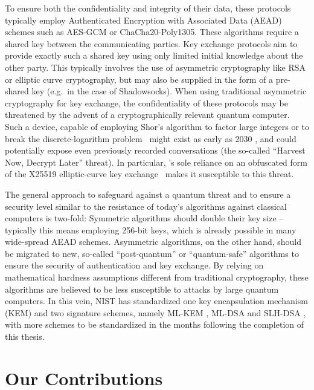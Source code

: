 To ensure both the confidentiality and integrity of their data, these protocols typically employ Authenticated Encryption with Associated Data (AEAD) schemes such as AES-GCM or ChaCha20-Poly1305. These algorithms require a shared key between the communicating parties. Key exchange protocols aim to provide exactly such a shared key using only limited initial knowledge about the other party. This typically involves the use of asymmetric cryptography like RSA or elliptic curve cryptography, but may also be supplied in the form of a pre-shared key (e.g.~in the case of Shadowsocks).
When using traditional asymmetric cryptography for key exchange, the confidentiality of these protocols may be threatened by the advent of a cryptographically relevant quantum computer.
Such a device, capable of employing Shor's algorithm \cite{Shor_1997} to factor large integers or to break the discrete-logarithm problem~\cite{crqc-nccoe} might exist as early as 2030 \cite{quantum-threat-nist,quantum-threat-enisa,quantum-threat-bsi,quantum-threat-joint,quantum-threat-anssi}, and could potentially expose even previously recorded conversations (the so-called ``Harvest Now, Decrypt Later'' threat). In particular, \obfsfour{}'s sole reliance on an obfuscated form of the X25519 elliptic-curve key exchange~\cite{x25519} makes it susceptible to this threat.

The general approach to safeguard against a quantum threat and to ensure a security level similar to the resistance of today's algorithms against classical computers is two-fold:
Symmetric algorithms should double their key size -- typically this means employing 256-bit keys, which is already possible in many wide-spread AEAD schemes. Asymmetric algorithms, on the other hand, should be migrated to new, so-called ``post-quantum'' or ``quantum-safe'' algorithms to ensure the security of authentication and key exchange. By relying on mathematical hardness assumptions different from traditional cryptography, these algorithms are believed to be less susceptible to attacks by large quantum computers. In this vein, NIST has standardized \cite{nist-standardization} one key encapsulation mechanism (KEM) and two signature schemes, namely ML-KEM \cite{fips203}, ML-DSA \cite{fips204} and SLH-DSA \cite{fips205}, with more schemes to be standardized in the months following the completion of this thesis.

\section{Our Contributions} \label{sec:contributions}

